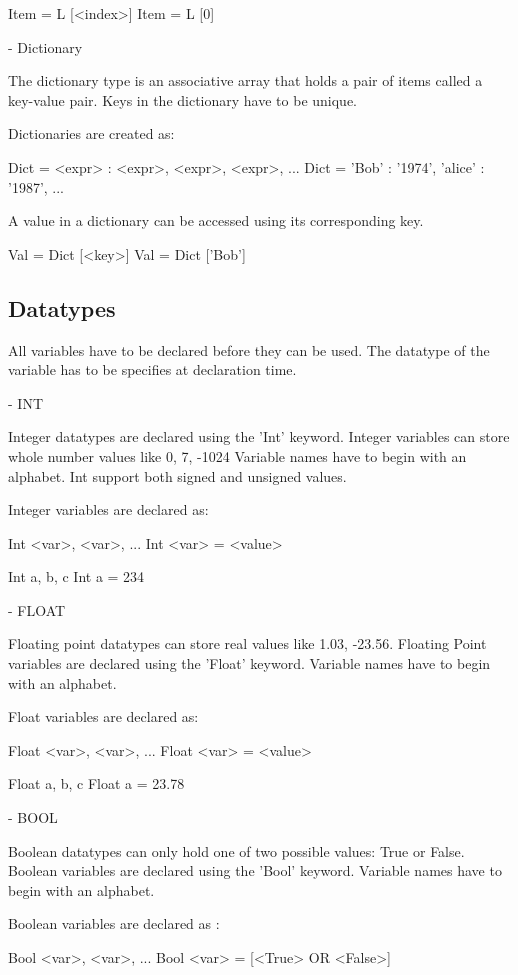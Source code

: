 Item = L [<index>]
Item = L [0]



- Dictionary

The dictionary type is an associative array that holds a pair of items called a key-value pair.
Keys in the dictionary have to be unique.

Dictionaries are created as:

Dict = {<expr> : <expr>, <expr>, <expr>, ...}
Dict = { 'Bob' : '1974', 'alice' : '1987', ...}

A value in a dictionary can be accessed using its corresponding key.

Val = Dict [<key>]
Val = Dict ['Bob']




\subsection{Datatypes}

All variables have to be declared before they can be used. The datatype of the variable has to be specifies at declaration time.


- INT

Integer datatypes are declared using the 'Int' keyword. Integer variables can store whole number values like 0, 7, -1024
Variable names have to begin with an alphabet. Int support both signed and unsigned values.

Integer variables are declared as:

Int <var>, <var>, ...
Int <var> = <value>

Int a, b, c
Int a = 234


- FLOAT

Floating point datatypes can store real values like 1.03, -23.56. Floating Point variables are declared using the 'Float' keyword. Variable names have to begin with an alphabet.

Float variables are declared as:

Float <var>, <var>, ...
Float <var> = <value>

Float a, b, c
Float a = 23.78


- BOOL

Boolean datatypes can only hold one of two possible values: True or False. Boolean variables are declared using the 'Bool' keyword. Variable names have to begin with an alphabet.

Boolean variables are declared as :

Bool <var>, <var>, ...
Bool <var> = [<True> OR <False>]

